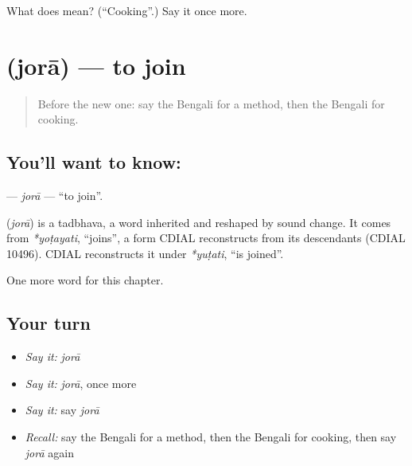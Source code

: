 \begin{tcolorbox}[breakable,colback=teal!4,colframe=teal!35!black,title={Before you move on}]
What does  mean? (\textquotedblleft{}Cooking\textquotedblright{}.) Say it once more.
\end{tcolorbox}
\section[\texorpdfstring{\bn{জোড়া} (jorā)}{জোড়া (jorā)}]{ (jorā) — to join}

\label{lesson:BN-C101-jora}



\begin{quote}
Before the new one: say the Bengali for a method, then the Bengali for cooking.
\end{quote}

\subsection*{You'll want to know: }
\textbf{} — \emph{jorā} — \textquotedblleft{}to join\textquotedblright{}.

\begin{cousinweb}
\textbf{} (\emph{jorā}) is a tadbhava, a word inherited and reshaped by sound change. It comes from \emph{*yoṭayati}, \textquotedblleft{}joins\textquotedblright{}, a form CDIAL reconstructs from its descendants (CDIAL 10496). CDIAL reconstructs it under \emph{*yuṭati}, \textquotedblleft{}is joined\textquotedblright{}.
\end{cousinweb}

\begin{grammarlens}[title={What you've built}]
One more word for this chapter.
\end{grammarlens}

\subsection*{Your turn}
\begin{itemize}
\raggedright
  \item \emph{Say it:} \emph{jorā}
  \item \emph{Say it:} \emph{jorā}, once more
  \item \emph{Say it:} say \emph{jorā}
  \item \emph{Recall:} say the Bengali for a method, then the Bengali for cooking, then say \emph{jorā} again
\end{itemize}

